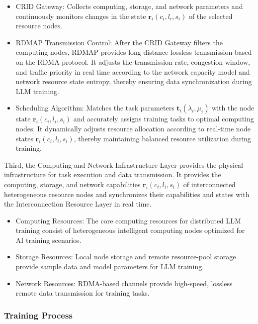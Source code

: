 \documentclass{ccjnl}
\begin{document}
\begin{itemize}[nosep]
	\item CRID Gateway: Collects computing, storage, and network parameters and continuously monitors changes in the state $\mathbf{r}_i(c_i,l_i,s_i)$ of the selected resource nodes.
	
	\item RDMAP Transmission Control: After the CRID Gateway filters the computing nodes, RDMAP provides long-distance lossless transmission based on the RDMA protocol. It adjusts the transmission rate, congestion window, and traffic priority in real time according to the network capacity model and network resource state entropy, thereby ensuring data synchronization during LLM training.
	
	\item Scheduling Algorithm: Matches the task parameters $\mathbf{t}_i(\lambda_i,\mu_i)$ with the node state $\mathbf{r}_i(c_i,l_i,s_i)$ and accurately assigns training tasks to optimal computing nodes. It dynamically adjusts resource allocation according to real-time node states $\mathbf{r}_i(c_i,l_i,s_i)$, thereby maintaining balanced resource utilization during training.
\end{itemize}

Third, the Computing and Network Infrastructure Layer provides the physical infrastructure for task execution and data transmission. It provides the computing, storage, and network capabilities $\mathbf{r}_i(c_i,l_i,s_i)$ of interconnected heterogeneous resource nodes and synchronizes their capabilities and states with the Interconnection Resource Layer in real time.

\begin{itemize}[nosep]
	\item Computing Resources: The core computing resources for distributed LLM training consist of heterogeneous intelligent computing nodes optimized for AI training scenarios.
	
	\item Storage Resources: Local node storage and remote resource-pool storage provide sample data and model parameters for LLM training.
	
	\item Network Resources: RDMA-based channels provide high-speed, lossless remote data transmission for training tasks.
\end{itemize}

\subsubsection{Training Process}
\label{s5-1-2}
\end{document}
